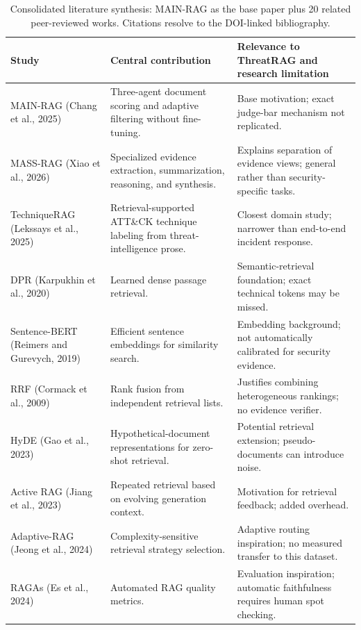 \documentclass[journal,twoside]{IEEEtran}
\begin{document}
\begin{table}[!tp]
\caption{Consolidated literature synthesis: MAIN-RAG as the base paper plus 20 related peer-reviewed works. Citations resolve to the DOI-linked bibliography.}
\label{tab:literature}
\centering
\scriptsize
\renewcommand{\arraystretch}{0.84}
\setlength{\tabcolsep}{4pt}
\begin{tabular}{p{}p{}p{}}
\toprule
Study & Central contribution & Relevance to ThreatRAG and research limitation\\ \midrule
MAIN-RAG (Chang et al., 2025) \cite{mainrag} & Three-agent document scoring and adaptive filtering without fine-tuning. & Base motivation; exact judge-bar mechanism not replicated.\\
MASS-RAG (Xiao et al., 2026) \cite{massrag} & Specialized evidence extraction, summarization, reasoning, and synthesis. & Explains separation of evidence views; general rather than security-specific tasks.\\
TechniqueRAG (Lekssays et al., 2025) \cite{techniquerag} & Retrieval-supported ATT\&CK technique labeling from threat-intelligence prose. & Closest domain study; narrower than end-to-end incident response.\\
DPR (Karpukhin et al., 2020) \cite{dpr} & Learned dense passage retrieval. & Semantic-retrieval foundation; exact technical tokens may be missed.\\
Sentence-BERT (Reimers and Gurevych, 2019) \cite{sbert} & Efficient sentence embeddings for similarity search. & Embedding background; not automatically calibrated for security evidence.\\
RRF (Cormack et al., 2009) \cite{rrf} & Rank fusion from independent retrieval lists. & Justifies combining heterogeneous rankings; no evidence verifier.\\
HyDE (Gao et al., 2023) \cite{hyde} & Hypothetical-document representations for zero-shot retrieval. & Potential retrieval extension; pseudo-documents can introduce noise.\\
Active RAG (Jiang et al., 2023) \cite{activerag} & Repeated retrieval based on evolving generation context. & Motivation for retrieval feedback; added overhead.\\
Adaptive-RAG (Jeong et al., 2024) \cite{adaptiverag} & Complexity-sensitive retrieval strategy selection. & Adaptive routing inspiration; no measured transfer to this dataset.\\
RAGAs (Es et al., 2024) \cite{ragas} & Automated RAG quality metrics. & Evaluation inspiration; automatic faithfulness requires human spot checking.\\

\end{tabular}
\end{table}
\end{document}

